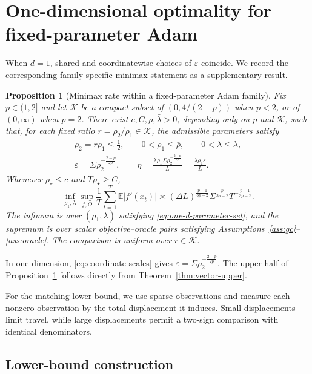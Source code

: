 \documentclass[11pt,letterpaper]{article}
\newtheorem{proposition}[theorem]{Proposition}
\theoremstyle{definition}
\newcommand{\E}{\mathbb E}
\newcommand{\eps}{\varepsilon}
\begin{document}
\section{One-dimensional optimality for fixed-parameter Adam}
\label{app:one-d}

When $d=1$, shared and coordinatewise choices of $\eps$ coincide. We record
the corresponding family-specific minimax statement as a supplementary result.

\begin{proposition}[Minimax rate within a fixed-parameter Adam family]
\label{prop:one-d}
Fix $p\in(1,2]$ and let $\mathcal K$ be a compact subset of
$(0,4/(2-p))$ when $p<2$, or of $(0,\infty)$ when $p=2$.
There exist $c,C,\bar\rho,\bar\lambda>0$, depending only on $p$ and
$\mathcal K$, such that, for each fixed ratio
$r=\rho_2/\rho_1\in\mathcal K$, the admissible parameters satisfy
\begin{equation}
\begin{gathered}
\rho_2=r\rho_1\le\tfrac12,\qquad
0<\rho_1\le\bar\rho,\qquad 0<\lambda\le\bar\lambda,\\
\eps=\Sigma\rho_2^{-\frac{2-p}{2p}},\qquad
\eta=\frac{\lambda\rho_1\Sigma\rho_2^{-\frac{2-p}{2p}}}{L}
=\frac{\lambda\rho_1\eps}{L}.
\end{gathered}
\label{eq:one-d-parameter-set}
\end{equation}
Whenever $\rho_\star\le c$ and $T\rho_\star\ge C$,
\[
\inf_{\rho_1,\lambda}
\sup_{f,O}
\frac1T\sum_{t=1}^T\E|f'(x_t)|
\asymp
(\Delta L)^{\frac{p-1}{3p-2}}
\Sigma^{\frac{p}{3p-2}}T^{-\frac{p-1}{3p-2}}.
\]
The infimum is over $(\rho_1,\lambda)$ satisfying
\eqref{eq:one-d-parameter-set}, and the supremum is over scalar
objective--oracle pairs satisfying
Assumptions~\ref{ass:gc}--\ref{ass:oracle}. The comparison is uniform over
$r\in\mathcal K$.
\end{proposition}

In one dimension, \eqref{eq:coordinate-scales} gives
$\eps=\Sigma\rho_2^{-\frac{2-p}{2p}}$. The upper half of
Proposition~\ref{prop:one-d} follows directly from
Theorem~\ref{thm:vector-upper}.

For the matching lower bound, we use sparse observations and measure each
nonzero observation by the total displacement it induces. Small displacements
limit travel, while large displacements permit a two-sign comparison with
identical denominators.

\subsection{Lower-bound construction}
\end{document}
